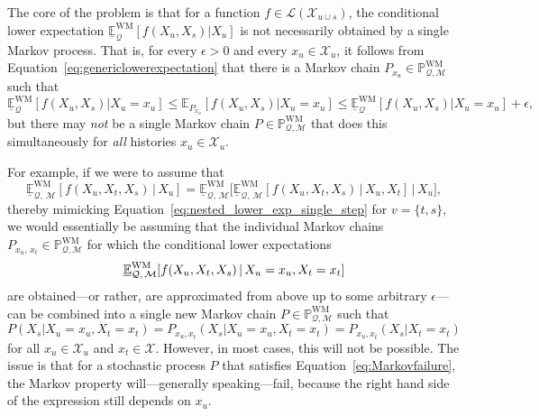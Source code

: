 \documentclass[10pt,a4paper]{paper}
\theoremstyle{definition}
\newcommand{\states}{\mathcal{X}}
\newcommand{\processes}{\mathbb{P}}
\newcommand{\wmprocesses}{\processes^{\mathrm{WM}}}
\newcommand{\gambles}{\mathcal{L}}
\newcommand{\rateset}{\mathcal{Q}}
\begin{document}
The core of the problem is that for a function $f\in\gambles(\states_{u\cup s})$, the conditional lower expectation $\underline{\mathbb{E}}_\rateset^\mathrm{WM}[f(X_u,X_s)\vert X_u]$ is not necessarily obtained by a single Markov process. %
That is, for every $\epsilon>0$ and every $x_u\in\states_u$, it follows from Equation~\eqref{eq:genericlowerexpectation} that there is a Markov chain $P_{x_u}\in\wmprocesses_{\rateset,\mathcal{M}}$ such that
\begin{equation*}
\underline{\mathbb{E}}_\rateset^\mathrm{WM}[f(X_u,X_s)\vert X_u=x_u]
\leq
\mathbb{E}_{P_{x_u}}[f(X_u,X_s)\vert X_u=x_u]\leq\underline{\mathbb{E}}_\rateset^\mathrm{WM}[f(X_u,X_s)\vert X_u=x_u]+\epsilon,
\end{equation*}
but there may \emph{not} be a single Markov chain $P\in\wmprocesses_{\rateset,\mathcal{M}}$ that does this simultaneously for \emph{all} histories $x_u\in\states_u$.

For example, if we were to assume that
\begin{equation*}%
\underline{\mathbb{E}}_{\rateset,\,\mathcal{M}}^{\mathrm{WM}}[f(X_u,X_t,X_s)\,\vert\,X_u] = \underline{\mathbb{E}}_{\rateset,\,\mathcal{M}}^{\mathrm{WM}}\bigl[ \underline{\mathbb{E}}_{\rateset,\,\mathcal{M}}^{\mathrm{WM}}[f(X_u,X_t,X_s)\,\vert\,X_u,X_t] \,\big\vert\,X_u\bigr],
\end{equation*}
thereby mimicking Equation~\eqref{eq:nested_lower_exp_single_step} for $v=\{t,s\}$, we would essentially be assuming that the individual Markov chains $P_{x_u,\,x_t}\in\wmprocesses_{\rateset,\mathcal{M}}$ for which the conditional lower expectations
\begin{equation*}
\underline{\mathbb{E}}_{\rateset,\,\mathcal{M}}^{\mathrm{WM}}[f(X_u,X_t,X_s)\,\vert\,X_u=x_u,X_t=x_t]\vspace{5pt}
\end{equation*}
are obtained---or rather, are approximated from above up to some arbitrary $\epsilon$---can be combined into a single new Markov chain $P\in\wmprocesses_{\rateset,\mathcal{M}}$ such that
\begin{equation}\label{eq:Markovfailure}
P(X_s\vert X_u=x_u,X_t=x_t)=P_{x_u,x_t}(X_s\vert X_u=x_u,X_t=x_t)=P_{x_u,x_t}(X_s\vert X_t=x_t)
\end{equation}
for all $x_u\in\states_u$ and $x_t\in\states$. However, in most cases, this will not be possible. The issue is that for a stochastic process $P$ that satisfies Equation~\eqref{eq:Markovfailure}, the Markov property will---generally speaking---fail, because the right hand side of the expression still depends on $x_u$.
\end{document}
